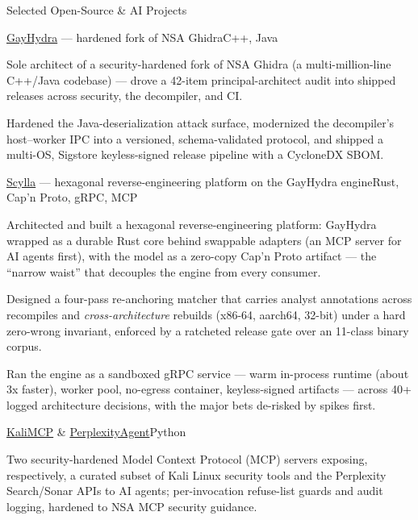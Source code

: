 \documentclass{resume} %
\begin{document}
\begin{rSection}{Selected Open-Source \& AI Projects}

\begin{rSubsection}{\href{https://github.com/CryptoJones/GayHydra}{GayHydra} --- hardened fork of NSA Ghidra}{C++, Java}{}{}
\item Sole architect of a security-hardened fork of NSA Ghidra (a multi-million-line C++/Java codebase) --- drove a 42-item principal-architect audit into shipped releases across security, the decompiler, and CI.
\item Hardened the Java-deserialization attack surface, modernized the decompiler's host--worker IPC into a versioned, schema-validated protocol, and shipped a multi-OS, Sigstore keyless-signed release pipeline with a CycloneDX SBOM.
\end{rSubsection}

\begin{rSubsection}{\href{https://github.com/CryptoJones/Scylla}{Scylla} --- hexagonal reverse-engineering platform on the GayHydra engine}{Rust, Cap'n Proto, gRPC, MCP}{}{}
\item Architected and built a hexagonal reverse-engineering platform: GayHydra wrapped as a durable Rust core behind swappable adapters (an MCP server for AI agents first), with the model as a zero-copy Cap'n Proto artifact --- the ``narrow waist'' that decouples the engine from every consumer.
\item Designed a four-pass re-anchoring matcher that carries analyst annotations across recompiles and \emph{cross-architecture} rebuilds (x86-64, aarch64, 32-bit) under a hard zero-wrong invariant, enforced by a ratcheted release gate over an 11-class binary corpus.
\item Ran the engine as a sandboxed gRPC service --- warm in-process runtime (about 3x faster), worker pool, no-egress container, keyless-signed artifacts --- across 40+ logged architecture decisions, with the major bets de-risked by spikes first.
\end{rSubsection}

\begin{rSubsection}{\href{https://github.com/CryptoJones/KaliMCP}{KaliMCP} \& \href{https://github.com/CryptoJones/PerplexityAgent}{PerplexityAgent}}{Python}{}{}
\item Two security-hardened Model Context Protocol (MCP) servers exposing, respectively, a curated subset of Kali Linux security tools and the Perplexity Search/Sonar APIs to AI agents; per-invocation refuse-list guards and audit logging, hardened to NSA MCP security guidance.
\end{rSubsection}


\end{rSection}
\end{document}
